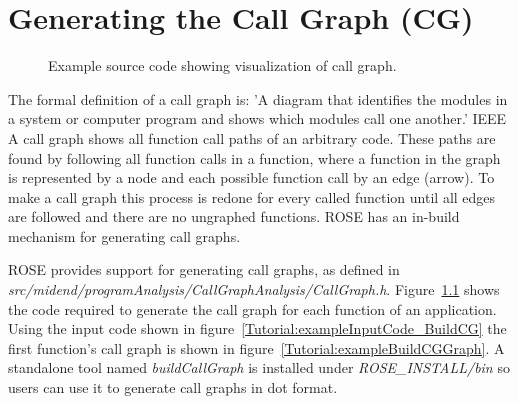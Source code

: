 \chapter{Generating the Call Graph (CG)}

\begin{figure}[!h]
{\indent
{\mySmallFontSize

\label{Tutorial:exampleBuildCG}

\begin{latexonly}
   
\end{latexonly}

\begin{htmlonly}
   
\end{htmlonly}

}
}
\caption{Example source code showing visualization of call graph.}
\end{figure}

The formal definition of a call graph is: 
\newline\newline
'A diagram that identifies the modules in a system or computer program and shows which modules call one another.' IEEE 
\newline\newline
A call graph shows all function call paths of an arbitrary code. These paths are found by following all 
function calls in a function, where a function in the graph is represented by a node and each possible function call by
an edge (arrow). To make a call graph this process is  redone for every called function until all edges are followed
and there are no ungraphed functions. ROSE has an in-build mechanism for generating call graphs. 

ROSE provides support for generating call graphs, as defined in
\textit{src/midend/programAnalysis/CallGraphAnalysis/CallGraph.h}.
   Figure~\ref{Tutorial:exampleBuildCG} shows the code required to generate
the call graph for each function of an application.  Using the input code shown in
figure~\ref{Tutorial:exampleInputCode_BuildCG} the first function's call graph is
shown in figure~\ref{Tutorial:exampleBuildCGGraph}.
A standalone tool named \textit{buildCallGraph} is installed under
\textit{ROSE\_INSTALL/bin} so users can use it to generate call graphs in
dot format.

